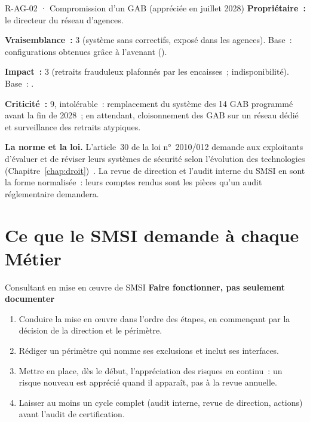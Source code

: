 \begin{boxobjet}{R-AG-02 · Compromission d'un GAB (appréciée en juillet 2028)}
\textbf{Propriétaire~:} le directeur du réseau d'agences.

\textbf{Vraisemblance~:} 3 (système sans correctifs, exposé dans les
agences). Base~: configurations obtenues grâce à l'avenant (\OUI{}).

\textbf{Impact~:} 3 (retraits frauduleux plafonnés par les encaisses~;
indisponibilité). Base~: \OUI{}.

\textbf{Criticité~:} 9, intolérable~: remplacement du système des 14 GAB
programmé avant la fin de 2028~; en attendant, cloisonnement des GAB sur un
réseau dédié et surveillance des retraits atypiques.
\end{boxobjet}

\begin{boxinfo}
\textbf{La norme et la loi.} L'article~30 de la loi n°~2010/012 demande
aux exploitants d'évaluer et de réviser leurs systèmes de sécurité selon
l'évolution des technologies (Chapitre~\ref{chap:droit})~\cite{loi2010012}.
La revue de direction et l'audit interne du SMSI en sont la forme
normalisée~: leurs comptes rendus sont les pièces qu'un audit réglementaire
demandera.
\end{boxinfo}

\section{Ce que le SMSI demande à chaque Métier}
\label{sec:c11-metiers}

\begin{boxmetier}{Consultant en mise en œuvre de SMSI}
\textbf{Faire fonctionner, pas seulement documenter}
\begin{enumerate}
    \item Conduire la mise en œuvre dans l'ordre des étapes, en commençant
          par la décision de la direction et le périmètre.
    \item Rédiger un périmètre qui nomme ses exclusions et inclut ses
          interfaces.
    \item Mettre en place, dès le début, l'appréciation des risques en
          continu~: un risque nouveau est apprécié quand il apparaît, pas à
          la revue annuelle.
    \item Laisser au moins un cycle complet (audit interne, revue de
          direction, actions) avant l'audit de certification.
\end{enumerate}
\end{boxmetier}

